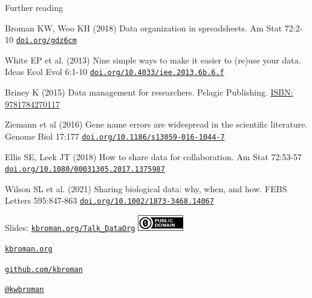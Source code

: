 \documentclass[aspectratio=169,12pt,t]{beamer}
\begin{document}
\begin{frame}{Further reading}


{\small

  \bi
\item Broman KW, Woo KH (2018) Data organization in spreadsheets. Am Stat 72:2-10
 \href{https://doi.org/gdz6cm}{\tt doi.org/gdz6cm}
\item White EP et al. (2013) Nine simple ways to make it easier to
  (re)use your data. Ideas Ecol Evol 6:1-10
  \href{https://doi.org/10.4033/iee.2013.6b.6.f}{\tt doi.org/10.4033/iee.2013.6b.6.f}
\item Briney K (2015) Data management for researchers. Pelagic
  Publishing.
  \href{https://pelagicpublishing.com/products/data-management-for-researchers-briney}{ISBN: 9781784270117}
\item Ziemann et al (2016) Gene name errors are widespread in the
  scientific literature. Genome Biol 17:177
  \href{https://doi.org/10.1186/s13059-016-1044-7}{\tt doi.org/10.1186/s13059-016-1044-7}
\item Ellis SE, Leek JT (2018) How to share data for collaboration.
  Am Stat 72:53-57
  \href{https://doi.org/10.1080/00031305.2017.1375987}{\tt doi.org/10.1080/00031305.2017.1375987}
\item Wilson SL et al. (2021) Sharing biological data: why, when, and
  how. FEBS Letters 595:847-863
  \href{https://doi.org/10.1002/1873-3468.14067}{\tt doi.org/10.1002/1873-3468.14067}
  \ei

}


\end{frame}


\begin{frame}[c]{}

\Large

Slides: \href{https://kbroman.org/Talk_DataOrg}{\tt kbroman.org/Talk\_DataOrg}
\hfill \includegraphics[height=7mm]{Figs/cc-zero.png}

\vspace{7mm}

\href{https://kbroman.org}{\tt \lolit kbroman.org}

\vspace{7mm}

\href{https://github.com/kbroman}{\tt \lolit github.com/kbroman}

\vspace{7mm}

\href{https://twitter.com/kwbroman}{\tt \lolit @kwbroman}



\end{frame}
\end{document}
